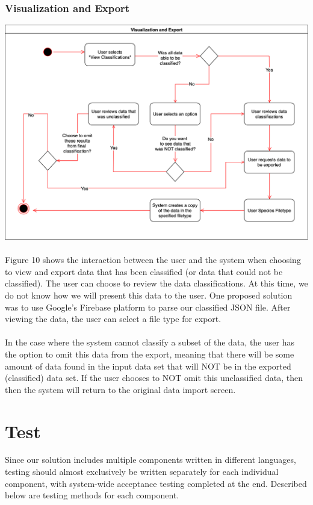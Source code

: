 \documentclass[12pt,oneside,letterpaper]{article}
\begin{document}
\subsubsection{Visualization and Export}
\includegraphics[scale = 0.40]{LandonExportActivityDiagram.png}
\begingroup
{}
\endgroup

\paragraph{}Figure 10 shows the interaction between the user and the system when choosing to view and export data that has been classified (or data that could not be classified). The user can choose to review the data classifications. At this time, we do not know how we will present this data to the user. One proposed solution was to use Google's Firebase platform to parse our classified JSON file. After viewing the data, the user can select a file type for export.

\paragraph{}In the case where the system cannot classify a subset of the data, the user has the option to omit this data from the export, meaning that there will be some amount of data found in the input data set that will NOT be in the exported (classified) data set. If the user chooses to NOT omit this unclassified data, then then the system will return to the original data import screen.

\section{Test}
Since our solution includes multiple components written in different languages, testing should almost exclusively be written separately for each individual component, with system-wide acceptance testing completed at the end. Described below are testing methods for each component.
\end{document}
